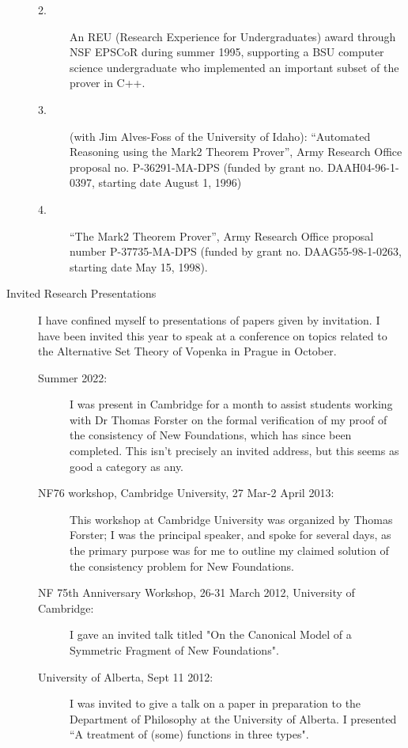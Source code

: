 \begin{description}
\begin{description}
\item[2.] An REU (Research Experience for Undergraduates) award through NSF
EPSCoR during summer 1995, supporting a BSU computer science
undergraduate who implemented an important subset of the prover in
C++.

\item[3.] (with Jim Alves-Foss of the University of Idaho):  ``Automated Reasoning using the Mark2 Theorem Prover'', Army Research Office proposal no.  P-36291-MA-DPS (funded
by grant no.  DAAH04-96-1-0397, starting date August 1, 1996) 

\item[4.] ``The Mark2 Theorem Prover'', Army Research Office proposal
number P-37735-MA-DPS (funded by grant no. DAAG55-98-1-0263, starting
date May 15, 1998).

\end{description}

\newpage

\item[Invited Research Presentations]

I have confined myself to presentations of papers given by invitation.  I have been invited this year to speak at a conference on topics related to the Alternative Set Theory of Vopenka in Prague in October.

\begin{description}

\item[Summer 2022:]  I was present in Cambridge for a month to assist students working with Dr Thomas Forster on the formal verification of my proof of the consistency of New Foundations, which has since been completed.  This isn't precisely an invited address, but this seems as good a category as any.

\item[NF76 workshop, Cambridge University, 27 Mar-2 April 2013:]  This workshop at Cambridge University was organized by Thomas Forster; I was the principal speaker, and spoke for several days, as the primary purpose was for me to outline my claimed solution of the consistency problem for New Foundations.

\item[NF 75th Anniversary Workshop, 26-31 March 2012, University of Cambridge:]  I gave an invited talk titled "On the Canonical Model of a Symmetric Fragment of New Foundations". 

\item[University of Alberta, Sept 11 2012:]  I was invited to give a talk on a paper in preparation to the Department of Philosophy at the University of Alberta.   I presented ``A treatment of (some) functions in three types".


\end{description}
\end{description}
